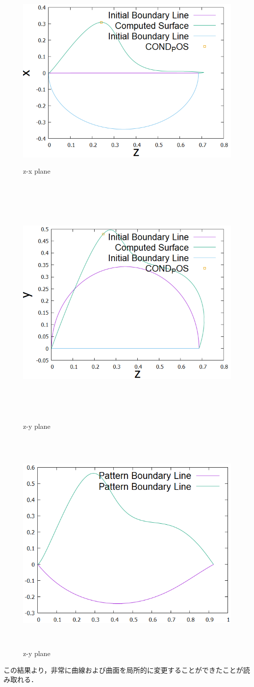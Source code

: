 \documentclass[16.7pt]{jsarticle}
\begin{document}
　   	\begin{figure}[H]
　   		\begin{minipage}{0.5\hsize}
　   			\centering
　   			\includegraphics[width = 1.0\columnwidth]{figure/0409/ObtainedRidgeLinefromz-x.png}
　   			\caption{z-x plane }
　   		\end{minipage}
	　   	\begin{minipage}{0.5\hsize}
	　   		\centering
	　   		\includegraphics[width = 1.0\columnwidth]{figure/0409/ObtainedRidgeLinefromz-y.png}
	　   		\caption{z-y plane }
	　   	\end{minipage}
　   	\end{figure}
　  	\begin{figure}[H]
　   		\centering
　   		\includegraphics[width = 0.4\columnwidth]{figure/0409/Patt2.png}
　   		\caption{z-y plane }
　   \end{figure}
	この結果より，非常に曲線および曲面を局所的に変更することができたことが読み取れる．
		
\end{document}
